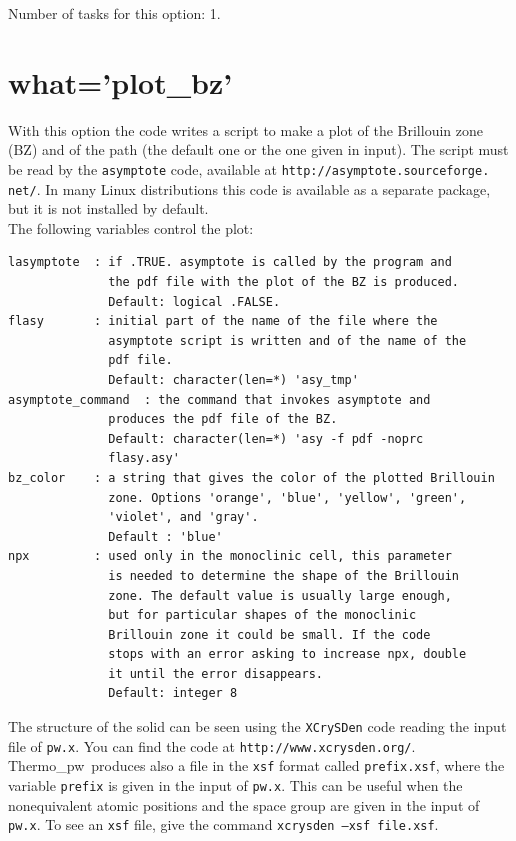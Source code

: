 \documentclass[12pt,a4paper,twoside]{report}
\def\thermo{{\sc Thermo}\_{\sc pw}}
\begin{document}
Number of tasks for this option: 1.

\newpage
{\color{coral}\section{what='plot\_bz'}}
\color{black}
With this option the code writes a script to make a plot
of the Brillouin zone (BZ) and of the path (the default one or the 
one given in input). 
The script must be read by the \texttt{asymptote} code, available at 
\texttt{http://asymptote.sourceforge.} \texttt{net/}. In many Linux 
distributions
this code is available as a separate package, but it is not installed by
default. \\
The following variables control the plot:

\begin{verbatim}
lasymptote  : if .TRUE. asymptote is called by the program and 
              the pdf file with the plot of the BZ is produced.
              Default: logical .FALSE.
flasy       : initial part of the name of the file where the 
              asymptote script is written and of the name of the 
              pdf file.
              Default: character(len=*) 'asy_tmp'
asymptote_command  : the command that invokes asymptote and 
              produces the pdf file of the BZ.
              Default: character(len=*) 'asy -f pdf -noprc 
              flasy.asy'
bz_color    : a string that gives the color of the plotted Brillouin 
              zone. Options 'orange', 'blue', 'yellow', 'green',
              'violet', and 'gray'.
              Default : 'blue'
npx         : used only in the monoclinic cell, this parameter 
              is needed to determine the shape of the Brillouin 
              zone. The default value is usually large enough, 
              but for particular shapes of the monoclinic 
              Brillouin zone it could be small. If the code 
              stops with an error asking to increase npx, double 
              it until the error disappears.
              Default: integer 8
\end{verbatim}

The structure of the solid can be seen using the \texttt{XCrySDen} code
reading the input file of \texttt{pw.x}. You can find the code at
\texttt{http://www.xcrysden.org/}. \thermo\ produces also a file in the
\texttt{xsf} format called \texttt{prefix.xsf}, where the variable 
\texttt{prefix}
is given in the input of \texttt{pw.x}. This can be useful when
the nonequivalent atomic positions and the space group are given in the input
of \texttt{pw.x}. To see an \texttt{xsf} file, give the command
\texttt{xcrysden --xsf file.xsf}.
\end{document}
